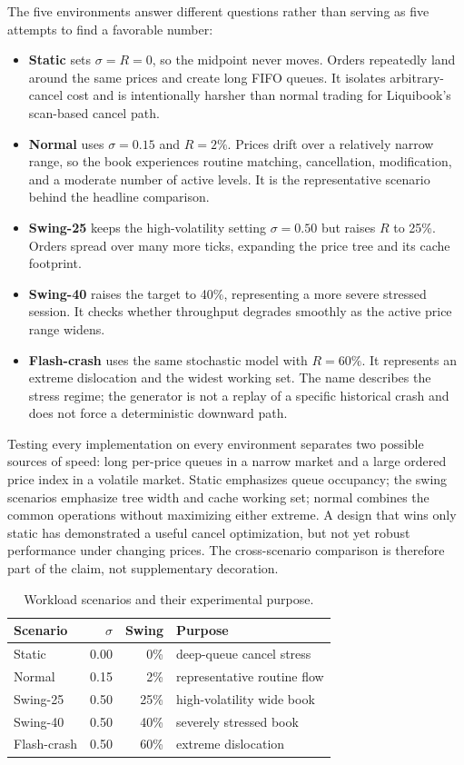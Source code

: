 \documentclass[10pt,twocolumn]{article}
\begin{document}
The five environments answer different questions rather than serving as five
attempts to find a favorable number:
\begin{itemize}
  \item \textbf{Static} sets $\sigma=R=0$, so the midpoint never moves.  Orders
        repeatedly land around the same prices and create long FIFO queues.  It
        isolates arbitrary-cancel cost and is intentionally harsher than normal
        trading for Liquibook's scan-based cancel path.
  \item \textbf{Normal} uses $\sigma=0.15$ and $R=2\%$.  Prices drift over a
        relatively narrow range, so the book experiences routine matching,
        cancellation, modification, and a moderate number of active levels.  It
        is the representative scenario behind the headline comparison.
  \item \textbf{Swing-25} keeps the high-volatility setting $\sigma=0.50$ but
        raises $R$ to 25\%.  Orders spread over many more ticks, expanding the
        price tree and its cache footprint.
  \item \textbf{Swing-40} raises the target to 40\%, representing a more severe
        stressed session.  It checks whether throughput degrades smoothly as
        the active price range widens.
  \item \textbf{Flash-crash} uses the same stochastic model with $R=60\%$.  It
        represents an extreme dislocation and the widest working set.  The name
        describes the stress regime; the generator is not a replay of a specific
        historical crash and does not force a deterministic downward path.
\end{itemize}

Testing every implementation on every environment separates two possible
sources of speed: long per-price queues in a narrow market and a large ordered
price index in a volatile market.  Static emphasizes queue occupancy; the swing
scenarios emphasize tree width and cache working set; normal combines the common
operations without maximizing either extreme.  A design that wins only static
has demonstrated a useful cancel optimization, but not yet robust performance
under changing prices.  The cross-scenario comparison is therefore part of the
claim, not supplementary decoration.

\begin{table}[h]
\centering
\caption{Workload scenarios and their experimental purpose.}
\label{tab:scenarios}
\scriptsize
\begin{tabular}{@{}lrrp{}@{}}
\toprule
Scenario & $\sigma$ & Swing & Purpose \\
\midrule
Static & 0.00 & 0\% & deep-queue cancel stress \\
Normal & 0.15 & 2\% & representative routine flow \\
Swing-25 & 0.50 & 25\% & high-volatility wide book \\
Swing-40 & 0.50 & 40\% & severely stressed book \\
Flash-crash & 0.50 & 60\% & extreme dislocation \\
\bottomrule
\end{tabular}
\end{table}
\end{document}
